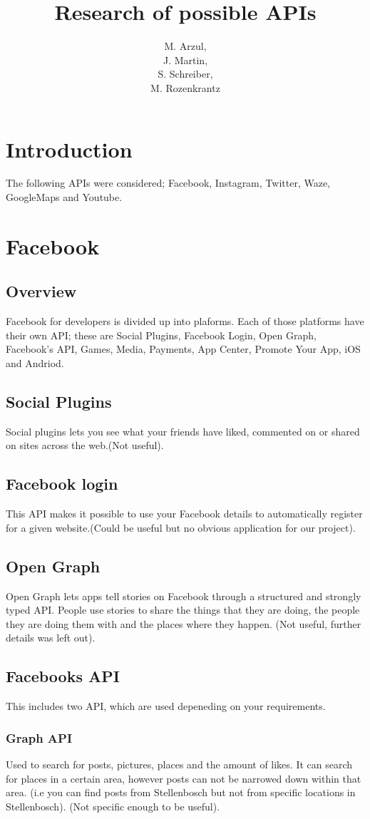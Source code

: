 \documentclass{article}
\title{Research of possible APIs}
\author{M. Arzul, \\
J. Martin, \\
S. Schreiber, \\
M. Rozenkrantz}
\date{}
\begin{document}
\maketitle
\tableofcontents
\newpage

\section{Introduction}
The following APIs were considered; Facebook, Instagram, Twitter, Waze, GoogleMaps and Youtube.

\section{Facebook}
\subsection{Overview}
Facebook for developers is divided up into plaforms. Each of those platforms have their own API; these are Social Plugins, Facebook Login, Open Graph, Facebook's API, Games, Media, Payments, App Center, Promote Your App, iOS and Andriod.
\subsection{Social Plugins}
Social plugins lets you see what your friends have liked, commented on or shared on sites across the web.(Not useful).
\subsection{Facebook login}
This API makes it possible to use your Facebook details to automatically register for
a given website.(Could be useful but no obvious application for our project).
\subsection{Open Graph}
Open Graph lets apps tell stories on Facebook through a structured and strongly typed API. People use stories to share the things that they are doing, the people they are doing them with and the places where they happen. (Not useful, further details was left out).
\subsection{Facebooks API}
This includes two API, which are used depeneding on your requirements.
\subsubsection{Graph API}
Used to search for posts, pictures, places and the amount of likes.
It can search for places in a certain area, however posts can not be narrowed down within that area. (i.e you can find posts from Stellenbosch but not from specific locations in Stellenbosch). (Not specific enough to be useful).
\end{document}
